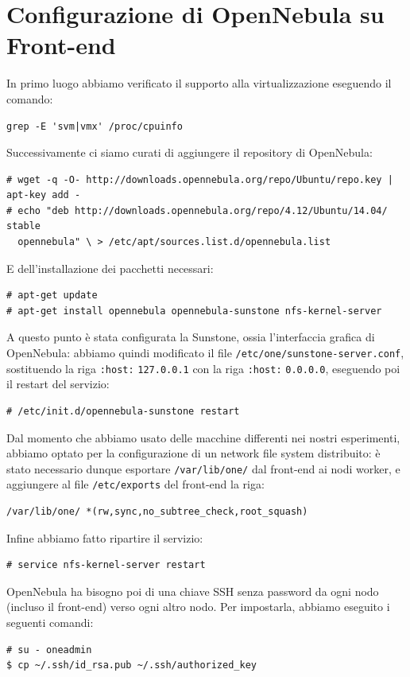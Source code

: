 \documentclass[twoside]{article}
\begin{document}
\section{Configurazione di OpenNebula su Front-end}
In primo luogo abbiamo verificato il supporto alla virtualizzazione eseguendo il comando:
\begin{lstlisting}[frame=trBL]
grep -E 'svm|vmx' /proc/cpuinfo
\end{lstlisting}

Successivamente ci siamo curati di aggiungere il repository di OpenNebula:
\begin{lstlisting}[frame=trBL]
# wget -q -O- http://downloads.opennebula.org/repo/Ubuntu/repo.key | apt-key add -
# echo "deb http://downloads.opennebula.org/repo/4.12/Ubuntu/14.04/ stable 
  opennebula" \ > /etc/apt/sources.list.d/opennebula.list
\end{lstlisting}

E dell'installazione dei pacchetti necessari:
\begin{lstlisting}[frame=trBL]
# apt-get update
# apt-get install opennebula opennebula-sunstone nfs-kernel-server
\end{lstlisting}

A questo punto è stata configurata la Sunstone, ossia l'interfaccia grafica di OpenNebula:
abbiamo quindi modificato il file 
\texttt{/etc/one/sunstone-server.conf}, sostituendo la riga \texttt{:host:} \texttt{127.0.0.1}
con la riga \texttt{:host:} \texttt{0.0.0.0}, eseguendo poi il restart del servizio:
\begin{lstlisting}[frame=trBL]
# /etc/init.d/opennebula-sunstone restart
\end{lstlisting}

Dal momento che abbiamo usato delle macchine differenti nei nostri esperimenti, abbiamo optato
per la configurazione di un network file system distribuito: è stato necessario dunque esportare
\texttt{/var/lib/one/} dal front-end ai nodi worker, e aggiungere al file \texttt{/etc/exports}
del front-end la riga:
\begin{lstlisting}[frame=trBL]
/var/lib/one/ *(rw,sync,no_subtree_check,root_squash)
\end{lstlisting}

Infine abbiamo fatto ripartire il servizio:
\begin{lstlisting}[frame=trBL]
# service nfs-kernel-server restart
\end{lstlisting}

OpenNebula ha bisogno poi di una chiave SSH senza password da ogni nodo (incluso il front-end)
verso ogni altro nodo. Per impostarla, abbiamo eseguito i seguenti comandi:
\begin{lstlisting}[frame=trBL]
# su - oneadmin
$ cp ~/.ssh/id_rsa.pub ~/.ssh/authorized_key
\end{lstlisting}
\end{document}

